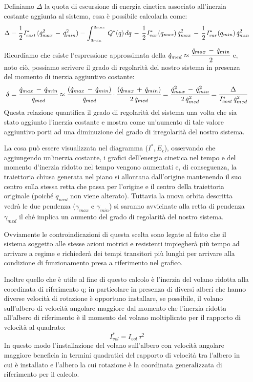 Definiamo $\Delta$ la quota di escursione di energia cinetica associato all'inerzia costante aggiunta al sistema, essa è possibile calcolarla come:
\[\Delta = \cfrac{1}{2}\,I^*_{cost}\,(\dot{q}_{max}^2\,-\,\dot{q}_{min}^2)= \int_{q_{min}}^{q_{max}}\,Q^*(q)\,dq\,-\,\cfrac{1}{2}\,I^*_{var}(q_{max})\,\dot{q}_{max}^2\,-\,\cfrac{1}{2}\,I^*_{var}(q_{min})\,\dot{q}_{min}^2 \]
 Ricordiamo che esiste l'espressione approssimata della $\dot{q}_{med} \approx \cfrac{\dot{q}_{max}\,-\,\dot{q}_{min}}{2}$ e, noto ciò, possiamo scrivere il grado di regolarità del nostro sistema in presenza del momento di inerzia aggiuntivo costante:
 \[\delta = \cfrac{\dot{q}_{max}\,-\,\dot{q}_{min}}{\dot{q}_{med}} \approx \cfrac{(\dot{q}_{max}\,-\,\dot{q}_{min})}{\dot{q}_{med}} \cdot\cfrac{(\dot{q}_{max}\,+\,\dot{q}_{min})}{2\,\dot{q}_{med}} = \cfrac{\dot{q}^2_{max}\,-\,\dot{q}^2_{min}}{2\,\dot{q}^2_{med}} = \cfrac{\Delta}{I^*_{cost}\,\dot{q}^2_{med}}\]
Questa relazione quantifica il grado di regolarità del sistema una volta che sia stato aggiunto l'inerzia costante e mostra come un'aumento di tale valore aggiuntivo porti ad una diminuzione del grado di irregolarità del nostro sistema.

La cosa può essere visualizzata nel diagramma ($I^*, E_c$), osservando che aggiungendo un'inerzia costante, i grafici dell'energia cinetica nel tempo e del momento d'inerzia ridotto nel tempo vengono aumentati e, di conseguenza, la traiettoria chiusa generata nel piano si allontana dall'origine mantenendo il suo centro sulla stessa retta che passa per l'origine e il centro della traiettoria originale (poiché $\dot{q}_{med}$ non viene alterato). Tuttavia la nuova orbita descritta vedrà le due pendenza ($\gamma_{max}$ e $\gamma_{min}$) si saranno avvicinate alla retta di pendenza $\gamma_{med}$ il ché implica un aumento del grado di regolarità del nostro sistema.

Ovviamente le controindicazioni di questa scelta sono legate al fatto che il sistema soggetto alle stesse azioni motrici e resistenti impiegherà più tempo ad arrivare a regime e richiederà dei tempi transitori più lunghi per arrivare alla condizione di funzionamento presa a riferimento nel grafico.

Inoltre quello che è utile al fine di questo calcolo è l'inerzia del volano ridotta alla coordinata di riferimento q; in particolare in presenza di diversi alberi che hanno diverse velocità di rotazione è opportuno installare, se possibile, il volano sull'albero di velocità angolare maggiore dal momento che l'inerzia ridotta all'albero di riferimento è il momento del volano moltiplicato per il rapporto di velocità al quadrato:
\[I^*_{vol} = I_{vol}\,\tau^2\]
In questo modo l'installazione del volano sull'albero con velocità angolare maggiore beneficia in termini quadratici del rapporto di velocità tra l'albero in cui è installato e l'albero la cui rotazione è la coordinata generalizzata di riferimento per il calcolo.

